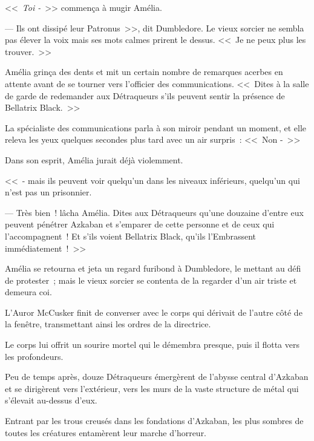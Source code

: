 <<~\emph{Toi -}~>> commença à mugir Amélia.

--- Ils ont dissipé leur Patronus~>>, dit Dumbledore. Le vieux sorcier ne sembla pas élever la voix mais ses mots calmes prirent le dessus. <<~Je ne peux plus les trouver.~>>

Amélia grinça des dents et mit un certain nombre de remarques acerbes en attente avant de se tourner vers l'officier des communications. <<~Dites à la salle de garde de redemander aux Détraqueurs s'ils peuvent sentir la présence de Bellatrix Black.~>>

La spécialiste des communications parla à son miroir pendant un moment, et elle releva les yeux quelques secondes plus tard avec un air surpris~: <<~Non -~>>

Dans son esprit, Amélia jurait déjà violemment.

<<~- mais ils peuvent voir quelqu'un dans les niveaux inférieurs, quelqu'un qui n'est pas un prisonnier.

--- Très bien~! lâcha Amélia. Dites aux Détraqueurs qu'une douzaine d'entre eux peuvent pénétrer Azkaban et s'emparer de cette personne et de ceux qui l'accompagnent~! Et s'ils voient Bellatrix Black, qu'ils l'Embrassent immédiatement~!~>>

Amélia se retourna et jeta un regard furibond à Dumbledore, le mettant au défi de protester~; mais le vieux sorcier se contenta de la regarder d'un air triste et demeura coi.

\later

L'Auror McCusker finit de converser avec le corps qui dérivait de l'autre côté de la fenêtre, transmettant ainsi les ordres de la directrice.

Le corps lui offrit un sourire mortel qui le démembra presque, puis il flotta vers les profondeurs.

Peu de temps après, douze Détraqueurs émergèrent de l'abysse central d'Azkaban et se dirigèrent vers l'extérieur, vers les murs de la vaste structure de métal qui s'élevait au-dessus d'eux.

Entrant par les trous creusés dans les fondations d'Azkaban, les plus sombres de toutes les créatures entamèrent leur marche d'horreur. 

